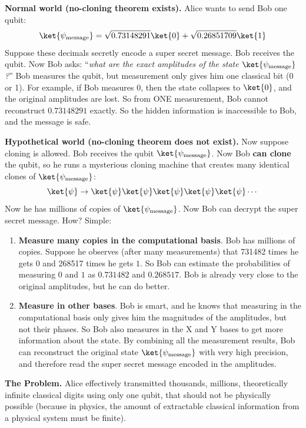 \begin{examplebox}
    \textcolor{Green3}{ \textbf{Normal world (no-cloning theorem exists).}} Alice wants to send Bob one qubit:
    \begin{equation*}
        \ket{\psi_{\text{message}}} = \sqrt{0.73148291}\ket{0} + \sqrt{0.26851709}\ket{1}
    \end{equation*}
    Suppose these decimals secretly encode a super secret message. Bob receives the qubit. Now Bob asks: ``\emph{what are the exact amplitudes of the state $\ket{\psi_{\text{message}}}$?}'' Bob measures the qubit, but measurement only gives him one classical bit (0 or 1). For example, if Bob measures $0$, then the state collapses to $\ket{0}$, and the original amplitudes are lost. So from ONE measurement, Bob cannot reconstruct $0.73148291$ exactly. So the hidden information is inaccessible to Bob, and the message is safe.

    \highspace
    \textcolor{Red2}{ \textbf{Hypothetical world (no-cloning theorem does not exist).}} Now suppose cloning is allowed. Bob receives the qubit $\ket{\psi_{\text{message}}}$. Now Bob \textbf{can clone} the qubit, so he runs a mysterious cloning machine that creates many identical clones of $\ket{\psi_{\text{message}}}$:
    \begin{equation*}
        \ket{\psi} \rightarrow \ket{\psi}\ket{\psi}\ket{\psi}\ket{\psi}\ket{\psi} \cdots
    \end{equation*}
    Now he has millions of copies of $\ket{\psi_{\text{message}}}$. Now Bob can decrypt the super secret message. How? Simple:
    \begin{enumerate}
        \item \textbf{Measure many copies in the computational basis}. Bob has millions of copies. Suppose he observes (after many measurements) that 731482 times he gets $0$ and 268517 times he gets $1$. So Bob can estimate the probabilities of measuring $0$ and $1$ as $0.731482$ and $0.268517$. Bob is already very close to the original amplitudes, but he can do better.
        \item \textbf{Measure in other bases}. Bob is smart, and he knows that measuring in the computational basis only gives him the magnitudes of the amplitudes, but not their phases. So Bob also measures in the X and Y bases to get more information about the state. By combining all the measurement results, Bob can reconstruct the original state $\ket{\psi_{\text{message}}}$ with very high precision, and therefore read the super secret message encoded in the amplitudes.
    \end{enumerate}
    \textcolor{Red2}{ \textbf{The Problem.}} Alice effectively transmitted thousands, millions, theoretically infinite classical digits using only one qubit, that should not be physically possible (because in physics, the amount of extractable classical information from a physical system must be finite).
\end{examplebox}

